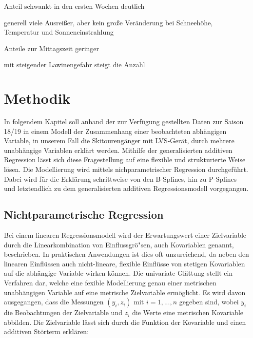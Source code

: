 \documentclass[12pt]{scrreprt}
\begin{document}
Anteil schwankt in den ersten Wochen deutlich



generell viele Ausreißer, aber kein große Veränderung bei Schneehöhe, Temperatur und Sonneneinstrahlung



Anteile zur Mittagszeit geringer



mit steigender Lawinengefahr steigt die Anzahl



\chapter{Methodik}

In folgendem Kapitel soll anhand der zur Verfügung gestellten Daten zur Saison 18/19 in einem Modell der Zusammenhang einer beobachteten abhängigen Variable, in unserem Fall die Skitourengänger mit LVS-Gerät, durch mehrere unabhängige Variablen erklärt werden.
Mithilfe der generalisierten additiven Regression lässt sich diese Fragestellung auf eine flexible und strukturierte Weise lösen. Die Modellierung wird mittels nichparametrischer Regression durchgeführt.
Dabei wird für die Erklärung schrittweise von den B-Splines, hin zu P-Splines und letztendlich zu dem generalisierten additiven Regressionsmodell vorgegangen.



\section{Nichtparametrische Regression}

Bei einem linearen Regressionsmodell wird der Erwartungswert einer Zielvariable durch die Linearkombination von Einflussgrö"sen, auch Kovariablen genannt, beschrieben. In praktischen Anwendungen ist dies oft unzureichend, da neben den linearen Einflüssen auch nicht-lineare, flexible Einflüsse von stetigen Kovariablen auf die abhängige Variable wirken können.
Die univariate Glättung stellt ein Verfahren dar, welche eine fexible Modellierung genau einer metrischen unabhängigen Variable auf eine metrische Zielvariable ermöglicht. Es wird davon ausgegangen, dass die Messungen $(y_{i},z_{i})$ mit $i=1,...,n$ gegeben sind, wobei $y_{i}$ die Beobachtungen der Zielvariable und $z_{i}$ die Werte eine metrischen Kovariable abbilden. Die Zielvariable lässt sich durch die Funktion der Kovariable und einen additiven Störterm erklären:
\end{document}
